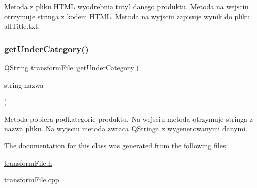Metoda z pliku H\+T\+ML wyodrebnia tutyl danego produktu. Metoda na wejsciu otrzymuje stringa z kodem H\+T\+ML. Metoda na wyjsciu zapisuje wynik do pliku all\+Title.\+txt. \mbox{\label{classtransform_file_a9c79f12406e77ce0595f8fb587813d28}} 
\subsubsection{\texorpdfstring{get\+Under\+Category()}{getUnderCategory()}}
{\footnotesize\ttfamily Q\+String transform\+File\+::get\+Under\+Category (\begin{DoxyParamCaption}\item[{string}]{nazwa }\end{DoxyParamCaption})}

Metoda pobiera podkategorie produktu. Na wejsciu metoda otrzymuje stringa z nazwa pliku. Na wyjsciu metoda zwraca Q\+Stringa z wygenerowanymi danymi. 

The documentation for this class was generated from the following files\+:\begin{DoxyCompactItemize}
\item 
\mbox{\hyperlink{transform_file_8h}{transform\+File.\+h}}\item 
\mbox{\hyperlink{transform_file_8cpp}{transform\+File.\+cpp}}\end{DoxyCompactItemize}
